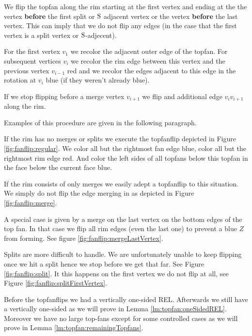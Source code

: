 We flip the topfan along the rim starting at the first vertex and ending at the the vertex \textbf{before} the first split or $\mathrm{S}$ adjacent vertex or the vertex \textbf{before} the last vertex. This can imply that we do not flip any edges (in the case that the first vertex is a split vertex or $\mathrm{S}$-adjecent).


For the first vertex $v_1$ we recolor the adjacent outer edge of the topfan. For subsequent vertices $v_i$ we recolor the rim edge between this vertex and the previous vertex $v_{i-1}$ red and we recolor the edges adjacent to this edge in the rotation at $v_i$ blue (if they weren't already blue).

If we stop flipping before a merge vertex $v_{i+1}$ we flip and additional edge $v_i v_{i+1}$ along the rim.

Examples of this procedure are given in the following paragraph.


If the rim has no merges or splits we execute the topfanflip depicted in Figure \ref{fig:fanflip:regular}. We color all but the rightmost fan edge blue, color all but the rightmost rim edge red. And color the left sides of all topfans below this topfan in the face below the current face blue.

If the rim consists of only merges we easily adept a topfanflip to this situation. We simply do not flip the edge merging in as depicted in Figure \ref{fig:fanflip:merge}.

A special case is given by a merge on the last vertex on the bottom edges of the top fan. In that case we flip all rim edges (even the last one) to prevent a blue $Z$ from forming. See figure \ref{fig:fanflip:mergeLastVertex}.

Splits are more difficult to handle. We are unfortunately unable to keep flipping once we hit a split hence we stop before we get that far. See Figure \ref{fig:fanflip:split}. It this happens on the first vertex we do not flip at all, see Figure \ref{fig:fanflip:splitFirstVertex}.

Before the topfanflips we had a vertically one-sided REL. Afterwards we still have a vertically one-sided \rel as we will prove in Lemma \ref{lm:topfan:oneSidedREL}. Moreover we have no large top-fans except for some controlled cases as we will prove in Lemma \ref{lm:topfan:remainingTopfans}.

